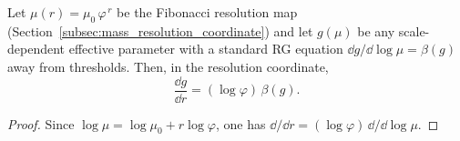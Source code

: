 \begin{proposition}\label{prop:rg_dictionary_r}
Let $\mu(r)=\mu_0\,\varphi^{\,r}$ be the Fibonacci resolution map (Section~\ref{subsec:mass_resolution_coordinate}) and let $g(\mu)$ be any scale-dependent effective parameter with a standard RG equation $\dd g/\dd\log\mu=\beta(g)$ away from thresholds.
Then, in the resolution coordinate,
\[
\frac{\dd g}{\dd r}=(\log\varphi)\,\beta(g).
\]
\end{proposition}
\begin{proof}
Since $\log\mu=\log\mu_0+r\log\varphi$, one has $\dd/\dd r=(\log\varphi)\,\dd/\dd\log\mu$.
\end{proof}


